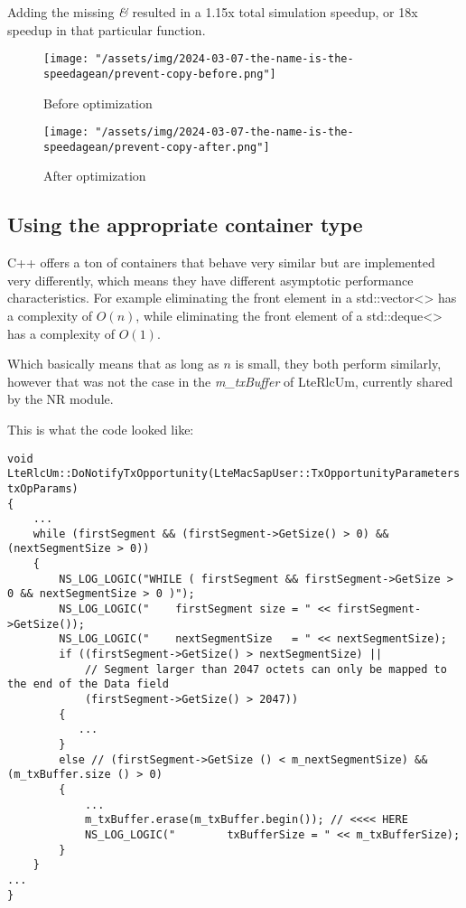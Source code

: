 \documentclass{article}
\begin{document}
Adding the missing \emph{&} resulted in a 1.15x total simulation speedup,
or 18x speedup in that particular function.

\begin{figure}
    \texttt{[image: "/assets/img/2024-03-07-the-name-is-the-speedagean/prevent-copy-before.png"]}
    \caption{Before optimization}
    \label{fig:prevent-copy-before}
\end{figure}

\begin{figure}
    \texttt{[image: "/assets/img/2024-03-07-the-name-is-the-speedagean/prevent-copy-after.png"]}
    \caption{After optimization}
    \label{fig:prevent-copy-after}
\end{figure}

\subsection{Using the appropriate container type}

C++ offers a ton of containers that behave very similar but
are implemented very differently, which means they have different
asymptotic performance characteristics. For example eliminating
the front element in a std::vector<> has a complexity of $O(n)$, while
eliminating the front element of a std::deque<> has a complexity of $O(1)$.

Which basically means that as long as $n$ is small, they both perform
similarly, however that was not the case in the \emph{m\_txBuffer}
of LteRlcUm, currently shared by the NR module.

This is what the code looked like:

\begin{lstlisting}
void
LteRlcUm::DoNotifyTxOpportunity(LteMacSapUser::TxOpportunityParameters txOpParams)
{
    ...
    while (firstSegment && (firstSegment->GetSize() > 0) && (nextSegmentSize > 0))
    {
        NS_LOG_LOGIC("WHILE ( firstSegment && firstSegment->GetSize > 0 && nextSegmentSize > 0 )");
        NS_LOG_LOGIC("    firstSegment size = " << firstSegment->GetSize());
        NS_LOG_LOGIC("    nextSegmentSize   = " << nextSegmentSize);
        if ((firstSegment->GetSize() > nextSegmentSize) ||
            // Segment larger than 2047 octets can only be mapped to the end of the Data field
            (firstSegment->GetSize() > 2047))
        {
           ...
        }
        else // (firstSegment->GetSize () < m_nextSegmentSize) && (m_txBuffer.size () > 0)
        {
            ...
            m_txBuffer.erase(m_txBuffer.begin()); // <<<< HERE
            NS_LOG_LOGIC("        txBufferSize = " << m_txBufferSize);
        }
    }
...
}
\end{lstlisting}
\end{document}
